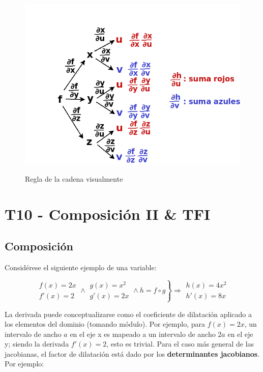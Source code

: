 \documentclass{article}
\begin{document}
\begin{figure}[ht]
\caption{Regla de la cadena visualmente}
\includegraphics[scale=.5]{img/teo_fig008_rc2.png} 
\centering
\label{fig:rc2}
\end{figure}

\section{T10 - Composición II \& TFI}

\subsection{Composición}

Considérese el siguiente ejemplo de una variable:

\begin{equation}
\left.
\begin{array}{ll}
f(x) = 2x \\
f'(x) = 2
\end{array}
\wedge
\begin{array}{ll}
g(x) = x^2 \\
g'(x) = 2x
\end{array}
\wedge
h = f \circ g
\right\} \Rightarrow
\begin{array}{ll}
h(x) = 4x^2 \\
h'(x) = 8x
\end{array}
\end{equation}

La derivada puede conceptualizarse como el coeficiente de dilatación aplicado a los elementos del dominio (tomando módulo).
Por ejemplo, para $f(x) = 2x$, un intervalo de ancho $a$ en el eje x es mapeado a un intervalo de ancho $2a$ en el eje y; siendo la derivada $f'(x)=2$, esto es trivial. Para el caso más general de las jacobianas, el factor de dilatación está dado por los \textbf{determinantes jacobianos}. Por ejemplo:
\end{document}
